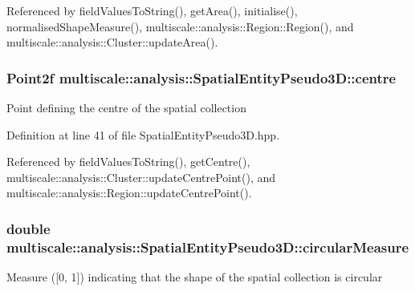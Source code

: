 \-Referenced by field\-Values\-To\-String(), get\-Area(), initialise(), normalised\-Shape\-Measure(), multiscale\-::analysis\-::\-Region\-::\-Region(), and multiscale\-::analysis\-::\-Cluster\-::update\-Area().

\hypertarget{classmultiscale_1_1analysis_1_1SpatialEntityPseudo3D_a647c25f9544d5537938bbadefc436634}{
\subsubsection[{centre}]{\setlength{\rightskip}{0pt plus 5cm}\-Point2f {\bf multiscale\-::analysis\-::\-Spatial\-Entity\-Pseudo3\-D\-::centre}}}\label{classmultiscale_1_1analysis_1_1SpatialEntityPseudo3D_a647c25f9544d5537938bbadefc436634}
\-Point defining the centre of the spatial collection 

\-Definition at line 41 of file \-Spatial\-Entity\-Pseudo3\-D.\-hpp.



\-Referenced by field\-Values\-To\-String(), get\-Centre(), multiscale\-::analysis\-::\-Cluster\-::update\-Centre\-Point(), and multiscale\-::analysis\-::\-Region\-::update\-Centre\-Point().

\hypertarget{classmultiscale_1_1analysis_1_1SpatialEntityPseudo3D_aa4ac170fb21e9697358d47ba6ea7a267}{
\subsubsection[{circular\-Measure}]{\setlength{\rightskip}{0pt plus 5cm}double {\bf multiscale\-::analysis\-::\-Spatial\-Entity\-Pseudo3\-D\-::circular\-Measure}}}\label{classmultiscale_1_1analysis_1_1SpatialEntityPseudo3D_aa4ac170fb21e9697358d47ba6ea7a267}
\-Measure (\mbox{[}0, 1\mbox{]}) indicating that the shape of the spatial collection is circular 


